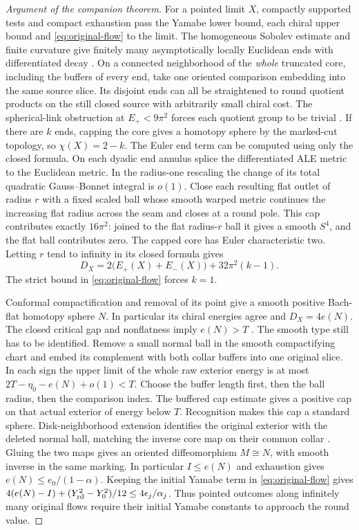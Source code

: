 \begin{proof}[Argument of the companion theorem]
For a pointed limit \(X\), compactly supported tests and compact
exhaustion pass the Yamabe lower bound, each chiral upper bound and
\eqref{eq:original-flow} to the limit. The homogeneous Sobolev estimate
and finite curvature give finitely many asymptotically locally Euclidean
ends with differentiated decay
\cite{TianViaclovsky2005ALE,TianViaclovsky2008Volume,AcheViaclovsky2011Obstruction}.
On a connected neighborhood of the \emph{whole} truncated core, including
the buffers of every end, take one oriented comparison embedding into the
same source slice. Its disjoint ends can all be straightened to round
quotient products on the still closed source with arbitrarily small
chiral cost. The spherical-link obstruction at \(E_+<9\pi^2\) forces
each quotient group to be trivial \cite[A quotient obstruction on the
closed source]{Baker2026MarkedNecks}. If there are \(k\) ends, capping
the core gives a homotopy sphere by the marked-cut topology, so
\(\chi(X)=2-k\). The Euler end term can be computed using only the closed formula.
On each dyadic end annulus splice the differentiated ALE metric to the
Euclidean metric. In the radius-one rescaling the change of its total
quadratic Gauss--Bonnet integral is \(o(1)\). Close each resulting flat
outlet of radius \(r\) with a fixed scaled ball whose smooth warped
metric continues the increasing flat radius across the seam and closes
at a round pole. This cap contributes exactly \(16\pi^2\): joined to the
flat radius-\(r\) ball it gives a smooth \(S^4\), and the flat ball
contributes zero. The capped core has Euler characteristic two.
Letting \(r\) tend to infinity in its closed formula gives
\[
 D_X=2\big(E_+(X)+E_-(X)\big)+32\pi^2(k-1).
\]
The strict bound in \eqref{eq:original-flow} forces \(k=1\).

Conformal compactification and removal of its point give a smooth
positive Bach-flat homotopy sphere \(N\). In particular its chiral
energies agree and \(D_X=4e(N)\). The closed critical gap and
nonflatness imply \(e(N)>T\)
\cite[Strict recognition and the closed critical gap]{Baker2026MarkedNecks}.
The smooth type still has to be identified. Remove a small normal ball
in the smooth compactifying chart and embed its complement with both
collar buffers into one original slice. In each sign the upper limit of the whole raw
exterior energy is at most \(2T-\eta_0-e(N)+o(1)<T\).
Choose the buffer length first, then the ball radius, then the comparison
index. The buffered cap estimate gives a positive cap on that actual
exterior of energy below \(T\). Recognition makes this cap a standard
sphere. Disk-neighborhood extension identifies the original exterior
with the deleted normal ball, matching the inverse core map on their
common collar \cite[Theorem C]{Palais1960Extending}. Gluing the two
maps gives an oriented diffeomorphism \(M\cong N\), with smooth
inverse in the same marking. In particular \(I\le e(N)\) and exhaustion
gives \(e(N)\le e_0/(1-\alpha)\).
Keeping the initial Yamabe term in \eqref{eq:original-flow} gives
\(4(e(N)-I)+(Y_{\rm rd}^2-Y_0^2)/12\le4\epsilon_j/\alpha_j\).
Thus pointed outcomes along infinitely many original flows require
their initial Yamabe constants to approach the round value.


\end{proof}
